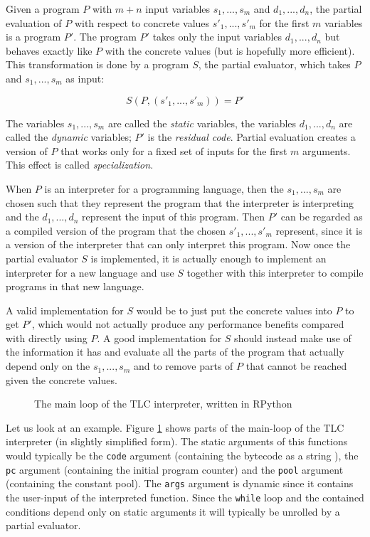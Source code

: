 Given a program $P$ with $m + n$ input variables $s_1, ..., s_m$ and $d_1, ...,
d_n$, the partial evaluation of $P$ with respect to concrete values $s'_1, ...,
s'_m$ for the first $m$ variables is a program $P'$. The program $P'$ takes only
the input variables $d_1, ..., d_n$ but behaves exactly like $P$ with the
concrete values (but is hopefully more efficient). This transformation is done
by a program $S$, the partial evaluator, which takes $P$ and $s_1, ..., s_m$ as
input:

    $$S(P, (s'_1, ..., s'_m)) = P'$$

The variables $s_1, ..., s_m$ are called the \emph{static} variables, the
variables $d_1, ..., d_n$ are called the \emph{dynamic} variables; $P'$ is the
\emph{residual code}. Partial evaluation creates a version of $P$ that works
only for a fixed set of inputs for the first $m$ arguments. This effect is
called \emph{specialization}.

When $P$ is an interpreter for a programming language, then the $s_1, ..., s_m$
are chosen such that they represent the program that the interpreter is
interpreting and the $d_1, ..., d_n$ represent the input of this program. Then
$P'$ can be regarded as a compiled version of the program that the chosen $s'_1,
..., s'_m$ represent, since it is a version of the interpreter that can only
interpret this program. Now once the partial evaluator $S$ is implemented, it is
actually enough to implement an interpreter for a new language and use $S$
together with this interpreter to compile programs in that new language.

A valid implementation for $S$ would be to just put the concrete values into $P$
to get $P'$, which would not actually produce any performance benefits compared with
directly using $P$. A good implementation for $S$ should instead make use of the
information it has and evaluate all the parts of the program that actually
depend only on the $s_1, ..., s_m$ and to remove parts of $P$ that cannot be
reached given the concrete values.

\begin{figure}[h]
\label{fig:tlc-main}
\begin{center}

\caption{The main loop of the TLC interpreter, written in RPython}
\end{center}
\end{figure}

Let us look at an example. Figure \ref{fig:tlc-main} shows parts of the
main-loop of the TLC interpreter (in slightly simplified form). The static
arguments of this functions would typically be the \lstinline{code} argument
(containing the bytecode as a string ), the \lstinline{pc} argument (containing
the initial program counter) and the \lstinline{pool} argument (containing the
constant pool). The \lstinline{args} argument is dynamic since it contains the
user-input of the interpreted function. Since the \lstinline{while} loop and the
contained conditions depend only on static arguments it will typically be
unrolled by a partial evaluator.


